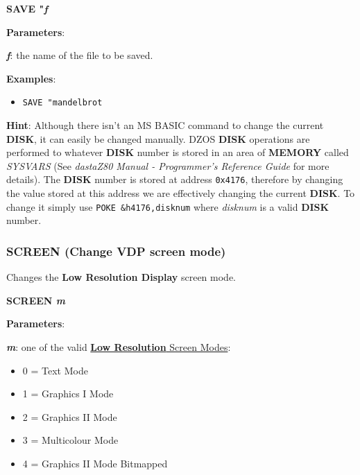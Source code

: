     \hspace{1.9cm}\textbf{SAVE "\textit{f}}

    \textbf{Parameters}:

    \hspace{1cm}\textbf{\textit{f}}: the name of the file to be
    saved.

    \textbf{Examples}:
    \begin{itemize}
        \item \texttt{SAVE "mandelbrot}
    \end{itemize}

    \textbf{Hint}: Although there isn't an MS BASIC command to change the
    current \textbf{DISK}, it can easily be changed manually. DZOS
    \textbf{DISK} operations are performed to whatever \textbf{DISK} number
    is stored in an area of \textbf{MEMORY} called \textit{SYSVARS}
    (See \textit{dastaZ80 Manual - Programmer’s Reference Guide} for more
    details). The \textbf{DISK} number is stored at address \texttt{0x4176},
    therefore by changing the value stored at this address we are
    effectively changing the current \textbf{DISK}. To change it simply use
    \texttt{POKE \&h4176,disknum} where \textit{disknum} is a valid
    \textbf{DISK} number.

    \subsubsection{{SCREEN (Change VDP screen mode)}}
    \label{msbasic:lang:screen}
    Changes the \textbf{Low Resolution Display} screen mode.

    \hspace{1.9cm}\textbf{SCREEN \textit{m}}

    \textbf{Parameters}:

    \hspace{1cm}\textbf{\textit{m}}: one of the valid
    \hyperref[sec:vdpscrmodes]{\textbf{Low Resolution} Screen Modes}:

    \begin{itemize}
        \item 0 = Text Mode
        \item 1 = Graphics I Mode
        \item 2 = Graphics II Mode
        \item 3 = Multicolour Mode
        \item 4 = Graphics II Mode Bitmapped
    \end{itemize}

